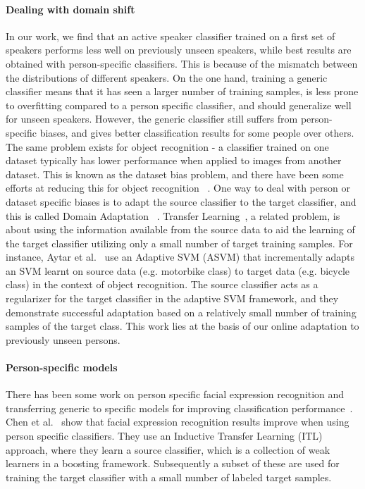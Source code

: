 \documentclass[runningheads]{llncs}
\begin{document}
\paragraph{Dealing with domain shift}
In our work, we find that an active speaker classifier trained on a first set of speakers performs less well on previously unseen speakers, while best results are obtained with person-specific classifiers. This is because of the mismatch between the distributions of different speakers.
On the one hand, training a generic classifier means that it has seen a larger number of training samples, is less prone to overfitting compared to a person specific classifier, and should generalize well for unseen speakers. However, the generic classifier still suffers from person-specific biases, and gives better classification results for some people over others. 
The same problem exists for object recognition - a classifier trained on one dataset typically has lower performance when applied to images from another dataset.
This is known as the dataset bias problem, and there have been some efforts at reducing this for object recognition ~\cite{Khosla12,Tommasi13}.
One way to deal with person or dataset specific biases is to adapt the source classifier to the target classifier, and this is called Domain Adaptation ~\cite{Aljundi15,Fernando13}.
Transfer Learning~\cite{Aytar11,Tommasi09,Tommasi10}, a related problem, is about using the information available from the source data to aid the learning of the target classifier utilizing only a small number of target training samples.
For instance, Aytar et al.~\cite{Aytar11} use an Adaptive SVM (ASVM) that incrementally adapts an SVM learnt on source data (e.g. motorbike class) to target data (e.g. bicycle class) in the context of object recognition. The source classifier acts as a regularizer for the target classifier in the adaptive SVM framework, and they demonstrate successful adaptation based on a relatively small number of training samples of the target class.
This work lies at the basis of our online adaptation to previously unseen persons.

\paragraph{Person-specific models} There has been some work on person specific facial expression recognition and transferring generic to specific models for improving classification performance~\cite{Chen12,Chu13,Zen14}.
Chen et al.~\cite{Chen12} show that facial expression recognition results improve when using person specific classifiers. They use an Inductive Transfer Learning (ITL) approach, where they learn a source classifier, which is a collection of weak learners in a boosting framework. Subsequently a subset of these are used for training the target classifier with a small number of labeled target samples. 
\end{document}
